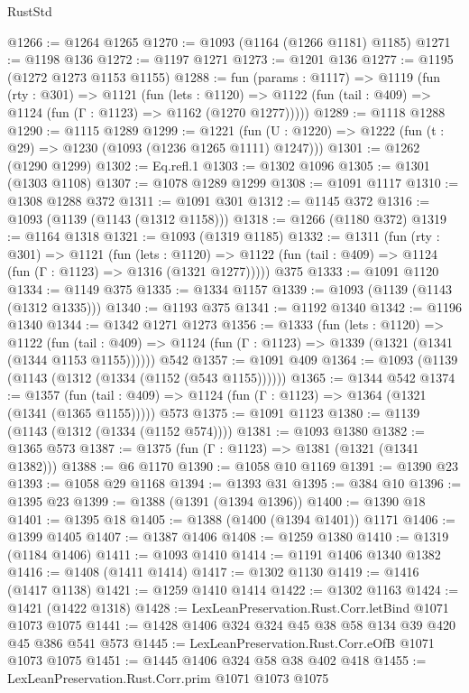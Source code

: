 \begin{lexlean}{RustStd}
\begin{coremodule}
{\begin{coremodule}
{{{{{{{{@1266 := @1264 @1265
@1270 := @1093 (@1164 (@1266 @1181) @1185)
@1271 := @1198 @136
@1272 := @1197 @1271
@1273 := @1201 @136
@1277 := @1195 (@1272 @1273 @1153 @1155)
@1288 := fun (params : @1117) =>
  @1119
    (fun (rty : @301) =>
    @1121
      (fun (lets : @1120) =>
      @1122 (fun (tail : @409) => @1124 (fun (Γ : @1123) => @1162 (@1270 @1277)))))
@1289 := @1118 @1288
@1290 := @1115 @1289
@1299 := @1221 (fun (U : @1220) => @1222 (fun (t : @29) => @1230 (@1093 (@1236 @1265 @1111) @1247)))
@1301 := @1262 (@1290 @1299)
@1302 := Eq.refl.{1}
@1303 := @1302 @1096
@1305 := @1301 (@1303 @1108)
@1307 := @1078 @1289 @1299
@1308 := @1091 @1117
@1310 := @1308 @1288 @372
@1311 := @1091 @301
@1312 := @1145 @372
@1316 := @1093 (@1139 (@1143 (@1312 @1158)))
@1318 := @1266 (@1180 @372)
@1319 := @1164 @1318
@1321 := @1093 (@1319 @1185)
@1332 := @1311
    (fun (rty : @301) =>
    @1121
      (fun (lets : @1120) =>
      @1122 (fun (tail : @409) => @1124 (fun (Γ : @1123) => @1316 (@1321 @1277)))))
    @375
@1333 := @1091 @1120
@1334 := @1149 @375
@1335 := @1334 @1157
@1339 := @1093 (@1139 (@1143 (@1312 @1335)))
@1340 := @1193 @375
@1341 := @1192 @1340
@1342 := @1196 @1340
@1344 := @1342 @1271 @1273
@1356 := @1333
    (fun (lets : @1120) =>
    @1122
      (fun (tail : @409) => @1124 (fun (Γ : @1123) => @1339 (@1321 (@1341 (@1344 @1153 @1155))))))
    @542
@1357 := @1091 @409
@1364 := @1093 (@1139 (@1143 (@1312 (@1334 (@1152 (@543 @1155))))))
@1365 := @1344 @542
@1374 := @1357
    (fun (tail : @409) => @1124 (fun (Γ : @1123) => @1364 (@1321 (@1341 (@1365 @1155)))))
    @573
@1375 := @1091 @1123
@1380 := @1139 (@1143 (@1312 (@1334 (@1152 @574))))
@1381 := @1093 @1380
@1382 := @1365 @573
@1387 := @1375 (fun (Γ : @1123) => @1381 (@1321 (@1341 @1382)))
@1388 := @6 @1170
@1390 := @1058 @10 @1169
@1391 := @1390 @23
@1393 := @1058 @29 @1168
@1394 := @1393 @31
@1395 := @384 @10
@1396 := @1395 @23
@1399 := @1388 (@1391 (@1394 @1396))
@1400 := @1390 @18
@1401 := @1395 @18
@1405 := @1388 (@1400 (@1394 @1401)) @1171
@1406 := @1399 @1405
@1407 := @1387 @1406
@1408 := @1259 @1380
@1410 := @1319 (@1184 @1406)
@1411 := @1093 @1410
@1414 := @1191 @1406 @1340 @1382
@1416 := @1408 (@1411 @1414)
@1417 := @1302 @1130
@1419 := @1416 (@1417 @1138)
@1421 := @1259 @1410 @1414
@1422 := @1302 @1163
@1424 := @1421 (@1422 @1318)
@1428 := LexLeanPreservation.Rust.Corr.letBind @1071 @1073 @1075
@1441 := @1428 @1406 @324 @324 @45 @38 @58 @134 @39 @420 @45 @386 @541 @573
@1445 := LexLeanPreservation.Rust.Corr.eOfB @1071 @1073 @1075
@1451 := @1445 @1406 @324 @58 @38 @402 @418
@1455 := LexLeanPreservation.Rust.Corr.prim @1071 @1073 @1075
}}}}}}}}
\end{coremodule}}
\end{coremodule}
\end{lexlean}
